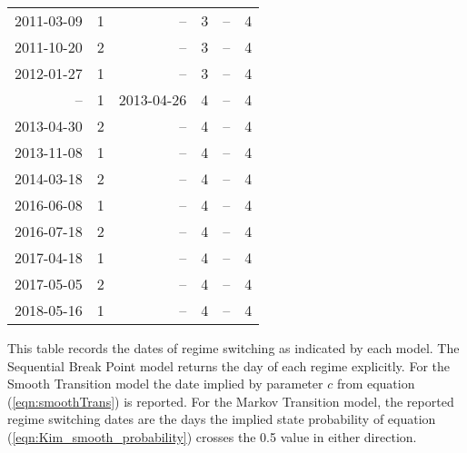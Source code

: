 \documentclass[12pt]{article}
\begin{document}
\begin{table}
\begin{tabular}[c]{r r | r r | r r}
		2011-03-09 &  1 &         -- &  3 &         -- &  4 \\
		2011-10-20 &  2 &         -- &  3 &         -- &  4 \\
		2012-01-27 &  1 &         -- &  3 &         -- &  4 \\
		        -- &  1 & 2013-04-26 &  4 &         -- &  4 \\
		2013-04-30 &  2 &         -- &  4 &         -- &  4 \\
		2013-11-08 &  1 &         -- &  4 &         -- &  4 \\
		2014-03-18 &  2 &         -- &  4 &         -- &  4 \\
		2016-06-08 &  1 &         -- &  4 &         -- &  4 \\
		2016-07-18 &  2 &         -- &  4 &         -- &  4 \\
		2017-04-18 &  1 &         -- &  4 &         -- &  4 \\
		2017-05-05 &  2 &         -- &  4 &         -- &  4 \\
		2018-05-16 &  1 &         -- &  4 &         -- &  4 \\
		\hline
	\end{tabular}
	\begin{tablenotes}
		\item{\footnotesize This table records the dates of regime switching as indicated by each model. The Sequential Break Point model returns the day of each regime explicitly. For the Smooth Transition model the date implied by parameter $c$ from equation (\ref{eqn:smoothTrans}) is reported. For the Markov Transition model, the reported regime switching dates are the days the implied state probability of equation (\ref{eqn:Kim_smooth_probability}) crosses the 0.5 value in either direction.}
	\end{tablenotes}
	\label{tbl:regime_changes_euro_yen}
\end{table}
\end{document}
